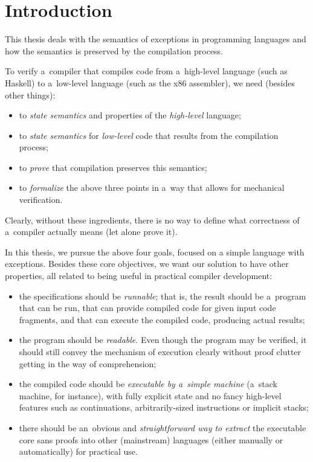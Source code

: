 \chapter*{Introduction}


This thesis deals with the semantics of exceptions in programming languages and how the semantics
is preserved by the compilation process.

To verify a~compiler that compiles code from a~high-level language (such as Haskell)
to a~low-level language (such as the x86 assembler), we need (besides other things):
\begin{itemize}
	\item to \emph{state semantics} and properties of the \emph{high-level} language;
	\item to \emph{state semantics} for \emph{low-level} code that results from the compilation process;
	\item to \emph{prove} that compilation preserves this semantics;
	\item to \emph{formalize} the above three points in a~way that allows for mechanical verification.
\end{itemize}
Clearly, without these ingredients, there is no way to define what correctness of a~compiler actually
means (let alone prove it).

In this thesis, we pursue the above four goals, focused on a simple language with exceptions.
Besides these core objectives, we want our solution to have other properties, all related
to being useful in practical compiler development:

\begin{itemize}\label{objectives}

	\item the specifications should be \emph{runnable}; that is, the result should be a~program
		that can be run, that can provide compiled code for given input code fragments, and
		that can execute the compiled code, producing actual results;
		
	\item the program should be \emph{readable}. Even though the program may be verified,
		it should still convey the mechanism of execution clearly without proof clutter getting
		in the way of comprehension;
		
	\item the compiled code should be \emph{executable by a~simple machine} (a~stack machine,
		for instance), with fully explicit state and no fancy high-level features such as
		continuations, arbitrarily-sized instructions or implicit stacks;
		
	\item there should be an~obvious and \emph{straightforward way to extract} the executable core
		sans proofs into other (mainstream) languages (either manually or automatically)
		for practical use.
		
\end{itemize}

